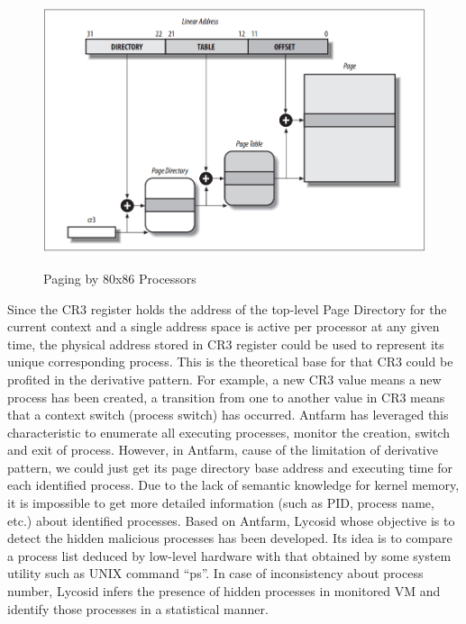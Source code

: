\begin{figure}[htbp]
	\centering
		\includegraphics[width=13cm, height= 8cm ]{Figures/FigureAppendix3.png}
	\caption{Paging by 80x86 Processors}
	\label{fig:Paging by 80x86 Processors}
\end{figure}

Since the CR3 register holds the address of the top-level Page Directory for the current context and a single address space is active
per processor at any given time, the physical address stored in CR3 register could be used to represent its unique corresponding 
process. This is the theoretical base for that CR3 could be profited in the derivative pattern. For example, a new CR3 value means 
a new process has been created, a transition from one to another value in CR3 means that a context switch (process switch) has 
occurred. Antfarm \cite{Reference4} has leveraged this characteristic to enumerate all executing processes, monitor the creation, switch and exit of 
process. However, in Antfarm, cause of the limitation of derivative pattern, we could just get its page directory base address and 
executing time for each identified process. Due to the lack of semantic knowledge for kernel memory, it is impossible to get more 
detailed information (such as PID, process name, etc.) about identified processes. Based on Antfarm, Lycosid \cite{Reference9} whose 
objective is to detect the hidden malicious processes has been developed. Its idea is to compare a process list deduced by low-level 
hardware with that obtained by some system utility such as UNIX command “ps”. In case of inconsistency about process number, Lycosid
infers the presence of hidden processes in monitored VM and identify those processes in a statistical manner.













